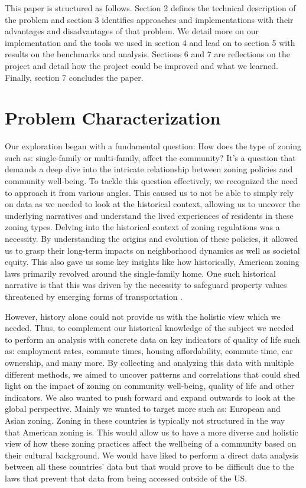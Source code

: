 \documentclass[titlepage]{article}
\begin{document}
This paper is structured  as follows. Section 2 defines the technical description of the problem and section 3 identifies approaches and implementations with their advantages and disadvantages of that problem. We detail more on our implementation and the tools we used in section 4 and lead on to section 5 with results on the benchmarks and analysis. Sections 6 and 7 are reflections on the project and detail how the project could be improved and what we learned. Finally, section 7 concludes the paper.


\section{Problem Characterization}
Our exploration began with a fundamental question: How does the type of zoning such as: single-family or multi-family, affect the community? It's a question that demands a deep dive into the intricate relationship between zoning policies and community well-being. To tackle this question effectively, we recognized the need to approach it from various angles. This caused us to not be able to simply rely on data as we needed to look at the historical context, allowing us to uncover the underlying narratives and understand the lived experiences of residents in these zoning types. Delving into the historical context of zoning regulations was a necessity. By understanding the origins and evolution of these policies, it allowed us to grasp their long-term impacts on neighborhood dynamics as well as societal equity. This also gave us some key insights like how historically, American zoning laws primarily revolved around the single-family home. One such historical narrative is that this was driven by the necessity to safeguard property values threatened by emerging forms of transportation \cite{History}.

However, history alone could not provide us with the holistic view which we needed. Thus, to complement our historical knowledge of the subject we needed to perform an analysis with concrete data on key indicators of quality of life such as: employment rates, commute times, housing affordability, commute time, car ownership, and many more. By collecting and analyzing this data with multiple different methods, we aimed to uncover patterns and correlations that could shed light on the impact of zoning on community well-being, quality of life and other indicators. We also wanted to push forward and expand outwards to look at the global perspective. Mainly we wanted to target more such as: European and Asian zoning. Zoning in these countries is typically not structured in the way that American zoning is. This would allow us to have a more diverse and holistic view of how these zoning practices affect the wellbeing of a community based on their cultural background. We would have liked to perform a direct data analysis between all these countries' data but that would prove to be difficult due to the laws that prevent that data from being accessed outside of the US.
\end{document}
